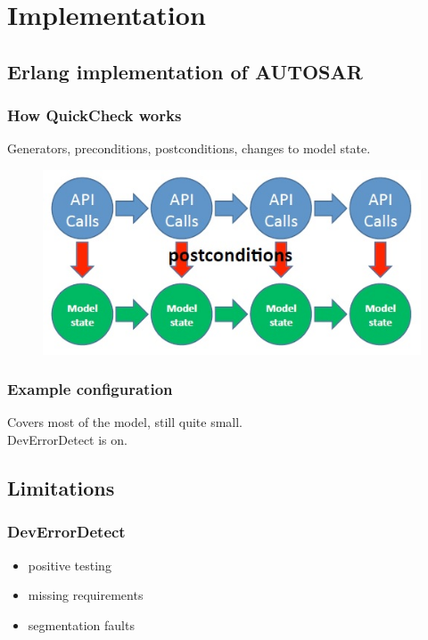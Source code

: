 \documentclass{beamer}
\begin{document}
\section{Implementation}


\subsection{Erlang implementation of AUTOSAR}

\begin{frame}
  \frametitle{How QuickCheck works}
  Generators, preconditions, postconditions, changes to model state.
  \begin{figure}
    \includegraphics[keepaspectratio, width=0.7\linewidth]{api_calls}
  \end{figure}
\end{frame}

\begin{frame}
  \frametitle{Example configuration}
  Covers most of the model, still quite small.\\
  DevErrorDetect is on.\\
\end{frame}

\subsection{Limitations}

\begin{frame}
  \frametitle{DevErrorDetect}
  \begin{itemize}
    \item positive testing
    \item missing requirements
    \item segmentation faults
  \end{itemize}
\end{frame}
\end{document}
